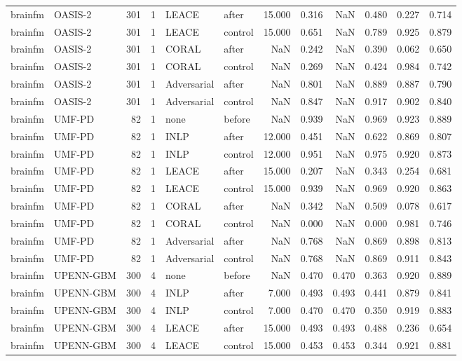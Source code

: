 \begin{tabular}{llrrllrrrrrr}
brainfm & OASIS-2 & 301 & 1 & LEACE & after & 15.000 & 0.316 & NaN & 0.480 & 0.227 & 0.714 \\
brainfm & OASIS-2 & 301 & 1 & LEACE & control & 15.000 & 0.651 & NaN & 0.789 & 0.925 & 0.879 \\
brainfm & OASIS-2 & 301 & 1 & CORAL & after & NaN & 0.242 & NaN & 0.390 & 0.062 & 0.650 \\
brainfm & OASIS-2 & 301 & 1 & CORAL & control & NaN & 0.269 & NaN & 0.424 & 0.984 & 0.742 \\
brainfm & OASIS-2 & 301 & 1 & Adversarial & after & NaN & 0.801 & NaN & 0.889 & 0.887 & 0.790 \\
brainfm & OASIS-2 & 301 & 1 & Adversarial & control & NaN & 0.847 & NaN & 0.917 & 0.902 & 0.840 \\
brainfm & UMF-PD & 82 & 1 & none & before & NaN & 0.939 & NaN & 0.969 & 0.923 & 0.889 \\
brainfm & UMF-PD & 82 & 1 & INLP & after & 12.000 & 0.451 & NaN & 0.622 & 0.869 & 0.807 \\
brainfm & UMF-PD & 82 & 1 & INLP & control & 12.000 & 0.951 & NaN & 0.975 & 0.920 & 0.873 \\
brainfm & UMF-PD & 82 & 1 & LEACE & after & 15.000 & 0.207 & NaN & 0.343 & 0.254 & 0.681 \\
brainfm & UMF-PD & 82 & 1 & LEACE & control & 15.000 & 0.939 & NaN & 0.969 & 0.920 & 0.863 \\
brainfm & UMF-PD & 82 & 1 & CORAL & after & NaN & 0.342 & NaN & 0.509 & 0.078 & 0.617 \\
brainfm & UMF-PD & 82 & 1 & CORAL & control & NaN & 0.000 & NaN & 0.000 & 0.981 & 0.746 \\
brainfm & UMF-PD & 82 & 1 & Adversarial & after & NaN & 0.768 & NaN & 0.869 & 0.898 & 0.813 \\
brainfm & UMF-PD & 82 & 1 & Adversarial & control & NaN & 0.768 & NaN & 0.869 & 0.911 & 0.843 \\
brainfm & UPENN-GBM & 300 & 4 & none & before & NaN & 0.470 & 0.470 & 0.363 & 0.920 & 0.889 \\
brainfm & UPENN-GBM & 300 & 4 & INLP & after & 7.000 & 0.493 & 0.493 & 0.441 & 0.879 & 0.841 \\
brainfm & UPENN-GBM & 300 & 4 & INLP & control & 7.000 & 0.470 & 0.470 & 0.350 & 0.919 & 0.883 \\
brainfm & UPENN-GBM & 300 & 4 & LEACE & after & 15.000 & 0.493 & 0.493 & 0.488 & 0.236 & 0.654 \\
brainfm & UPENN-GBM & 300 & 4 & LEACE & control & 15.000 & 0.453 & 0.453 & 0.344 & 0.921 & 0.881 \\

\end{tabular}
